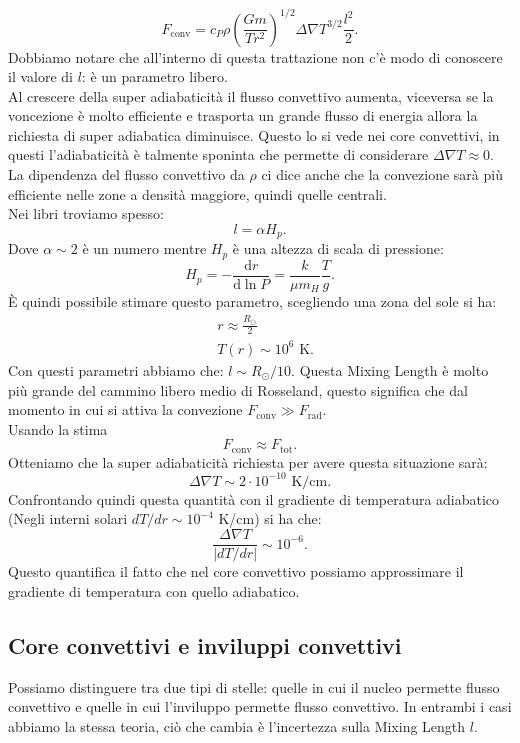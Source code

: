 \[
	F_\text{conv} 
	=
	c_P \rho \left( \frac{Gm}{Tr^2} \right) ^{1/2} \Delta\nabla T^{3/2} \frac{l^2}{2}
	\label{eq:flusso-convettivo}
.\] 
Dobbiamo notare che all'interno di questa trattazione non c'è modo di conoscere il valore di $l$: è un parametro libero.\\
Al crescere della super adiabaticità il flusso convettivo aumenta, viceversa se la voncezione è molto efficiente e trasporta un grande flusso di energia allora la richiesta di super adiabatica diminuisce. Questo lo si vede nei core convettivi, in questi l'adiabaticità è talmente sponinta che permette di considerare $\Delta\nabla T \approx 0$.\\
La dipendenza del flusso convettivo da $\rho $ ci dice anche che la convezione sarà più efficiente nelle zone a densità maggiore, quindi quelle centrali.\\
Nei libri troviamo spesso:
\[
	l = \alpha  H_p
.\] 
Dove $\alpha\sim 2$ è un numero mentre $H_p$ è una altezza di scala di pressione:
\[
	H_p = - \frac{\mbox{d} r}{\mbox{d} \ln P} 
	=
	\frac{k}{\mu m_H}\frac{T}{g}
.\] 
È quindi possibile stimare questo parametro, scegliendo una zona del sole si ha:
\[\begin{aligned}
	&r \approx \frac{R_{\odot}}{2}\\
	& T(r) \sim 10^6 \text{ K}
.\end{aligned}\]
Con questi parametri abbiamo che: $l \sim R_{\odot}/10$. Questa Mixing Length è molto più grande del cammino libero medio di Rosseland, questo significa che dal momento in cui si attiva la convezione $F_\text{conv} \gg F_\text{rad} $.\\
Usando la stima
\[
	F_\text{conv} \approx F_\text{tot} 
.\] 
Otteniamo che la super adiabaticità richiesta per avere questa situazione sarà:
\[
	\Delta\nabla T \sim 2 \cdot 10^{-10} \text{ K/cm}
.\] 
Confrontando quindi questa quantità con il gradiente di temperatura adiabatico (Negli interni solari $dT/dr \sim 10^{-4}$ K/cm) si ha che:
\[
	\frac{\Delta\nabla T}{\left| dT/dr \right| } \sim 10^{-6}
.\] 
Questo quantifica il fatto che nel core convettivo possiamo approssimare il gradiente di temperatura con quello adiabatico.\\
\subsection{Core convettivi e inviluppi convettivi}
\label{subsec:Core convettivi e inviluppi convettivi}
Possiamo distinguere tra due tipi di stelle: quelle in cui il nucleo permette flusso convettivo e quelle in cui l'inviluppo permette flusso convettivo. In entrambi i casi abbiamo la stessa teoria, ciò che cambia è l'incertezza sulla Mixing Length $l$.
